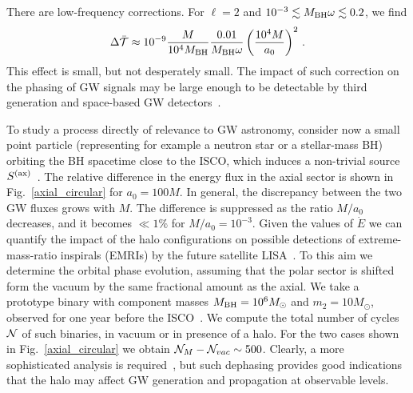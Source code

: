 \documentclass[twocolumn,preprintnumbers,nofootinbib,prd,superscriptaddress,aps]{revtex4-1}
\def\be{\begin{equation}}
\def\ee{\end{equation}}
\def\be{\begin{equation}}
\def\ee{\end{equation}}
\begin{document}
There are low-frequency corrections. For $\ell=2$ and $10^{-3} \lesssim  M_{\rm BH} \omega\lesssim 0.2$, we find
%
\be
\Delta \bar{\cal T}\approx%
10^{-9}\frac{M}{10^4M_{\rm BH}}\frac{0.01}{M_{\rm BH}\omega}\left(\frac{10^4M}{a_0}\right)^2\,.
\ee
%
This effect is small, but not desperately small. The impact of such correction on the phasing of GW signals may be large enough to be detectable by third generation and space-based GW detectors~\cite{LISA:2017pwj,Seoane:2021kkk,Maggiore:2019uih}.

To study a process directly of relevance to GW astronomy, consider now 
a small point particle (representing for example a neutron star or a stellar-mass BH) orbiting the BH spacetime close to the ISCO, 
which induces a non-trivial source $S^{\rm (ax)}$~\cite{Zerilli:1970wzz,Martel:2005ir}. 
The relative difference in the energy flux in the axial sector is shown in Fig.~\ref{axial_circular} for $a_0=100M$. 
In general, the discrepancy between the two GW fluxes grows with $M$. The difference is suppressed as the ratio $M/a_0$ decreases, and 
it becomes $\ll 1\%$ for $M/a_0=10^{-3}$. Given the values of $\dot{E}$ we 
can quantify the impact of the halo configurations on possible detections 
of extreme-mass-ratio inspirals (EMRIs) by the future satellite LISA~\cite{LISA:2017pwj}. 
To this aim we determine the orbital phase evolution, assuming that the polar sector is shifted form the vacuum 
by the same fractional amount as the axial. We take a prototype binary 
with component masses $M_{\rm BH}=10^6M_\odot$ and $m_2=10M_\odot$, observed 
for one year before the ISCO~\cite{Maselli:2020zgv}. We compute the total 
number of cycles ${\cal N}$ of such binaries, in vacuum or in presence of a halo. 
For the two cases shown in Fig.~\ref{axial_circular} we obtain 
${\cal N}_M-{\cal N}_{vac}\sim 500$. 
Clearly, a more sophisticated analysis is required~\cite{Maselli:2021men}, but such dephasing 
provides good indications that the halo may affect GW generation and propagation at observable levels.
\end{document}
